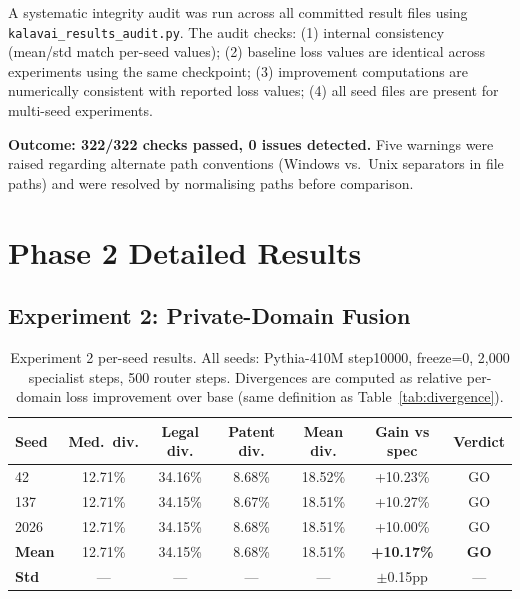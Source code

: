 \documentclass{article}
\begin{document}
A systematic integrity audit was run across all committed result files using \texttt{kalavai\_results\_audit.py}. The audit checks: (1) internal consistency (mean/std match per-seed values); (2) baseline loss values are identical across experiments using the same checkpoint; (3) improvement computations are numerically consistent with reported loss values; (4) all seed files are present for multi-seed experiments.

\textbf{Outcome: 322/322 checks passed, 0 issues detected.} Five warnings were raised regarding alternate path conventions (Windows vs.\ Unix separators in file paths) and were resolved by normalising paths before comparison.

\section{Phase 2 Detailed Results}
\label{app:phase2}

\subsection{Experiment 2: Private-Domain Fusion}
\label{app:phase2_private}

\begin{table}[h]
\centering
\caption{Experiment 2 per-seed results. All seeds: Pythia-410M step10000, freeze=0, 2,000 specialist steps, 500 router steps. Divergences are computed as relative per-domain loss improvement over base (same definition as Table~\ref{tab:divergence}).}
\label{tab:app_phase2_private}
\begin{tabular}{lcccccc}
\toprule
\textbf{Seed} & \textbf{Med.\ div.} & \textbf{Legal div.} & \textbf{Patent div.} & \textbf{Mean div.} & \textbf{Gain vs spec} & \textbf{Verdict} \\
\midrule
42   & 12.71\% & 34.16\% & 8.68\% & 18.52\% & +10.23\% & GO \\
137  & 12.71\% & 34.15\% & 8.67\% & 18.51\% & +10.27\% & GO \\
2026 & 12.71\% & 34.15\% & 8.68\% & 18.51\% & +10.00\% & GO \\
\midrule
\textbf{Mean} & 12.71\% & 34.15\% & 8.68\% & 18.51\% & \textbf{+10.17\%} & \textbf{GO} \\
\textbf{Std}  & ---     & ---     & ---    & ---     & $\pm$0.15pp & --- \\
\bottomrule
\end{tabular}
\end{table}
\end{document}
